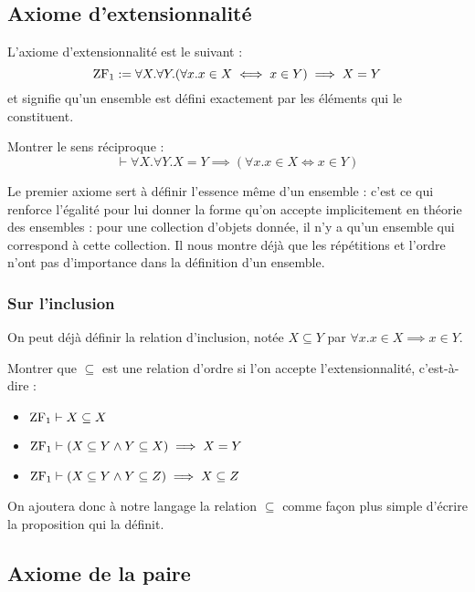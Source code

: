 \subsection{Axiome d'extensionnalité}

\begin{ax}[Extensionnalité]
    L'axiome d'extensionnalité est le suivant : $$\mathrm{ZF}_1 := \forall X.\forall Y. (\forall x. x\in X\iff x\in Y)\implies X=Y$$
    et signifie qu'un ensemble est défini exactement par les éléments qui le constituent.
\end{ax}

\begin{exo}
    Montrer le sens réciproque : $$\vdash\forall X.\forall Y. X=Y\implies (\forall x. x\in X\iff x\in Y)$$
\end{exo}

Le premier axiome sert à définir l'essence même d'un ensemble : c'est ce qui renforce l'égalité pour lui donner la forme qu'on accepte implicitement en théorie des ensembles : pour une collection d'objets donnée, il n'y a qu'un ensemble qui correspond à cette collection. Il nous montre déjà que les répétitions et l'ordre n'ont pas d'importance dans la définition d'un ensemble.

\subsubsection{Sur l'inclusion}

On peut déjà définir la relation d'inclusion, notée $X\subseteq Y$ par $\forall x. x\in X\implies x \in Y$.

\begin{exo}
    Montrer que $\subseteq$ est une relation d'ordre si l'on accepte l'extensionnalité, c'est-à-dire :
    \begin{itemize}[label=$\bullet$]
        \item $\mathrm{ZF}_1\vdash X\subseteq X$
        \item $\mathrm{ZF}_1\vdash (X\subseteq Y \land Y\subseteq X)\implies X = Y$
        \item $\mathrm{ZF}_1\vdash (X\subseteq Y \land Y\subseteq Z) \implies X\subseteq Z$
    \end{itemize}
\end{exo}

On ajoutera donc à notre langage la relation $\subseteq$ comme façon plus simple d'écrire la proposition qui la définit.

\subsection{Axiome de la paire}

